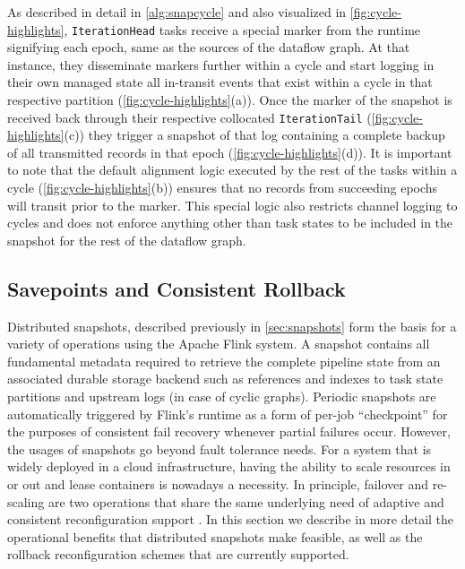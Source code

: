 As described in detail in \autoref{alg:snapcycle} and also visualized in \autoref{fig:cycle-highlights}, \texttt{IterationHead} tasks receive a special marker from the runtime signifying each epoch, same as the sources of the dataflow graph. At that instance, they disseminate markers further within a cycle and start logging in their own managed state all in-transit events that exist within a cycle in that respective partition (\autoref{fig:cycle-highlights}(a)). Once the marker of the snapshot is received back through their respective collocated \texttt{IterationTail} (\autoref{fig:cycle-highlights}(c)) they trigger a snapshot of that log containing a complete backup of all transmitted records in that epoch (\autoref{fig:cycle-highlights}(d)). It is important to note that the default alignment logic executed by the rest of the tasks within a cycle (\autoref{fig:cycle-highlights}(b)) ensures that no records from succeeding epochs will transit prior to the marker. This special logic also restricts channel logging to cycles and does not enforce anything other than task states to be included in the snapshot for the rest of the dataflow graph.



\subsection{Savepoints and Consistent Rollback}

Distributed snapshots, described previously in \autoref{sec:snapshots} form the basis for a variety of operations using the Apache Flink system. A snapshot contains all fundamental metadata required to retrieve the complete pipeline state from an associated durable storage backend such as references and indexes to task state partitions and upstream logs (in case of cyclic graphs). Periodic snapshots are automatically triggered by Flink's runtime as a form of per-job ``checkpoint'' for the purposes of consistent fail recovery whenever partial failures occur. However, the usages of snapshots go beyond fault tolerance needs. For a system that is widely deployed in a cloud infrastructure, having the ability to scale resources in or out and lease containers is nowadays a necessity. In principle, failover and re-scaling are two operations that share the same underlying need of adaptive and consistent reconfiguration support \cite{castro2013integrating}. In this section we describe in more detail the operational benefits that distributed snapshots make feasible, as well as the rollback reconfiguration schemes that are currently supported.

